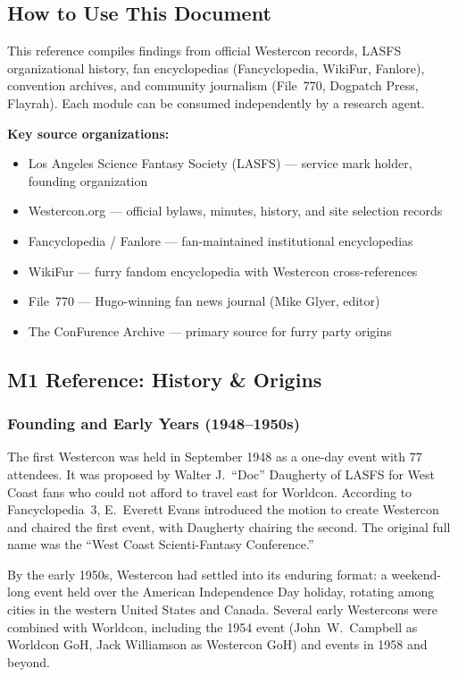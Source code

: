 \documentclass[11pt,letterpaper]{article}
\begin{document}
\subsection{How to Use This Document}

This reference compiles findings from official Westercon records, LASFS organizational history, fan encyclopedias (Fancyclopedia, WikiFur, Fanlore), convention archives, and community journalism (File~770, Dogpatch Press, Flayrah). Each module can be consumed independently by a research agent.

\textbf{Key source organizations:}
\begin{itemize}[leftmargin=2em]
  \item Los Angeles Science Fantasy Society (LASFS) --- service mark holder, founding organization
  \item Westercon.org --- official bylaws, minutes, history, and site selection records
  \item Fancyclopedia / Fanlore --- fan-maintained institutional encyclopedias
  \item WikiFur --- furry fandom encyclopedia with Westercon cross-references
  \item File~770 --- Hugo-winning fan news journal (Mike Glyer, editor)
  \item The ConFurence Archive --- primary source for furry party origins
\end{itemize}

\subsection{M1 Reference: History \& Origins}

\subsubsection{Founding and Early Years (1948--1950s)}

The first Westercon was held in September 1948 as a one-day event with 77 attendees. It was proposed by Walter J.\ ``Doc'' Daugherty of LASFS for West Coast fans who could not afford to travel east for Worldcon. According to Fancyclopedia~3, E.\ Everett Evans introduced the motion to create Westercon and chaired the first event, with Daugherty chairing the second. The original full name was the ``West Coast Scienti-Fantasy Conference.''

By the early 1950s, Westercon had settled into its enduring format: a weekend-long event held over the American Independence Day holiday, rotating among cities in the western United States and Canada. Several early Westercons were combined with Worldcon, including the 1954 event (John~W.\ Campbell as Worldcon GoH, Jack Williamson as Westercon GoH) and events in 1958 and beyond.
\end{document}
